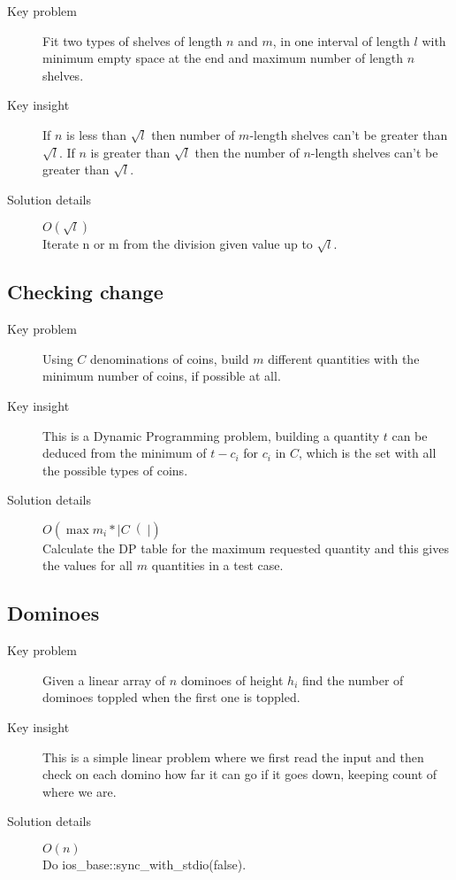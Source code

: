 \documentclass[11pt]{book}
\begin{document}
\begin{description}
	\item[Key problem] Fit two types of shelves of length $n$ and $m$, in one interval of length $l$ with minimum empty space at the end and maximum number of length $n$ shelves.
	\item[Key insight] If $n$ is less than $\sqrt{l}$ then number of $m$-length shelves can't be greater than $\sqrt{l}$. If $n$ is greater than $\sqrt{l}$ then the number of $n$-length shelves can't be greater than $\sqrt{l}$.
	\item[Solution details] $O(\sqrt{l})$ \\ Iterate n or m from the division given value up to $\sqrt{l}$.
\end{description}

\subsection{Checking change}

\begin{description}
	\item[Key problem] Using $C$ denominations of coins, build $m$ different quantities with the minimum number of coins, if possible at all.
	\item[Key insight] This is a Dynamic Programming problem, building a quantity $t$ can be deduced from the minimum of $t - c_i$ for $c_i$ in $C$, which is the set with all the possible types of coins.
	\item[Solution details] $O(\max{m_i}*\left|C\right(|)$ \\ Calculate the DP table for the maximum requested quantity and this gives the values for all $m$ quantities in a test case.
\end{description}

\subsection{Dominoes}

\begin{description}
	\item[Key problem] Given a linear array of $n$ dominoes of height $h_i$ find the number of dominoes toppled when the first one is toppled.
	\item[Key insight] This is a simple linear problem where we first read the input and then check on each domino how far it can go if it goes down, keeping count of where we are.
	\item[Solution details] $O(n)$ \\ Do ios\_base::sync\_with\_stdio(false).
\end{description}
\end{document}

